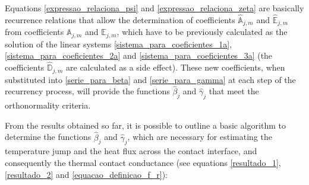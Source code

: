 \documentclass[12pt]{CHT-20}
\begin{document}
Equations \eqref{expressao_relaciona_psi} and \eqref{expressao_relaciona_zeta} are basically recurrence relations that allow the determination of coefficients $\hat{\mathbb{A}}_{j,m}$ and $\hat{\mathbb{E}}_{j,m}$ from coefficients $\mathbb{A}_{j,m}$ and $\mathbb{E}_{j,m}$, which have to be previously calculated as the solution of the linear systems \eqref{sistema_para_coeficientes_1a}, \eqref{sistema_para_coeficientes_2a} and \eqref{sistema_para_coeficientes_3a} (the coefficients $\hat{\mathbb{D}}_{j,m}$ are calculated as a side effect). These new coefficients, when substituted into \eqref{serie_para_beta} and \eqref{serie_para_gamma} at each step of the recurrency process, will provide the functions $\hat{\beta}_j$ and $\hat{\gamma}_j$ that meet the orthonormality criteria. 

From the results obtained so far, it is possible to outline a basic algorithm to determine the functions $\hat{\beta}_j$ and $\hat{\gamma}_j$, which are necessary for estimating the temperature jump and the heat flux across the contact interface, and consequently the thermal contact conductance (see equations \ref{resultado_1}, \ref{resultado_2} and \ref{equacao_definicao_f_r}): 
\end{document}
